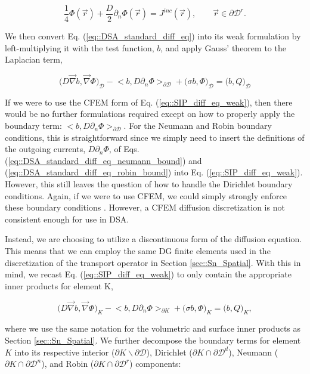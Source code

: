 \begin{equation}
\label{eq::DSA_standard_diff_eq_robin_bound}
\frac{1}{4}\Phi (\vec{r}) + \frac{D}{2} \partial_n \Phi (\vec{r}) = J^{inc} (\vec{r}), \qquad \vec{r} \in \partial \mathcal{D}^r .
\end{equation}

\noindent We then convert Eq. (\ref{eq::DSA_standard_diff_eq}) into its weak formulation by left-multiplying it with the test function, $b$, and apply Gauss' theorem to the Laplacian term,

\begin{equation}
\label{eq::SIP_diff_eq_weak}
\Big(  D \vec{\nabla}  b , \vec{\nabla} \Phi  \Big)_{\mathcal{D}} - \Big<  b, D \partial_n \Phi \Big>_{\partial \mathcal{D}} + \Big(  \sigma   b ,  \Phi  \Big)_{\mathcal{D}}  = \Big(  b, Q  \Big)_{\mathcal{D}}
\end{equation}

\noindent If we were to use the CFEM form of Eq. (\ref{eq::SIP_diff_eq_weak}), then there would be no further formulations required except on how to properly apply the boundary term: $\Big<  b, D \partial_n \Phi \Big>_{\partial \mathcal{D}}$. For the Neumann and Robin boundary conditions, this is straightforward since we simply need to insert the definitions of the outgoing currents, $ D \partial_n \Phi$, of Eqs. (\ref{eq::DSA_standard_diff_eq_neumann_bound}) and (\ref{eq::DSA_standard_diff_eq_robin_bound}) into Eq. (\ref{eq::SIP_diff_eq_weak}). However, this still leaves the question of how to handle the Dirichlet boundary conditions. Again, if we were to use CFEM, we could simply strongly enforce these boundary conditions \cite{akin1982application}. However, a CFEM diffusion discretization is not consistent enough for use in DSA.

Instead, we are choosing to utilize a discontinuous form of the diffusion equation. This means that we can employ the same DG finite elements used in the discretization of the transport operator in Section \ref{sec::Sn_Spatial}. With this in mind, we recast Eq. (\ref{eq::SIP_diff_eq_weak}) to only contain the appropriate inner products for element K,

\begin{equation}
\label{eq::SIP_diff_eq_weak_cellK}
\Big(  D \vec{\nabla}  b , \vec{\nabla} \Phi  \Big)_{K} - \Big<  b, D \partial_n \Phi \Big>_{\partial K} + \Big(  \sigma   b ,  \Phi  \Big)_{K}  = \Big(  b, Q  \Big)_{K} ,
\end{equation}

\noindent where we use the same notation for the volumetric and surface inner products as Section \ref{sec::Sn_Spatial}. We further decompose the boundary terms for element $K$ into its respective interior ($\partial K \backslash \partial \mathcal{D}$), Dirichlet ($\partial K \cap \partial \mathcal{D}^d$), Neumann ($\partial K \cap \partial \mathcal{D}^n$), and Robin ($\partial K \cap \partial \mathcal{D}^r$) components:

